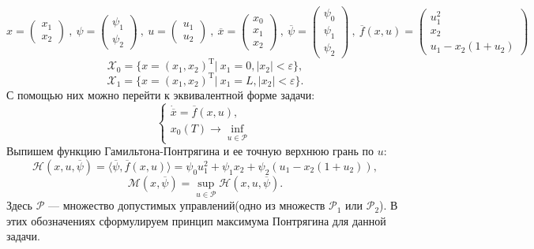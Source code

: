 \documentclass[10pt]{article}
\begin{document}
\[ x = \begin{pmatrix} x_1 \\ x_2 \end{pmatrix} \ , \ \psi = \begin{pmatrix} \psi_1 \\ \psi_2 \end{pmatrix} \ , \  u = \begin{pmatrix} u_1 \\ u_2 \end{pmatrix} \ , \ \overline{x} = \begin{pmatrix} x_0 \\ x_1 \\ x_2 \end{pmatrix} \ , \ \overline{\psi} = \begin{pmatrix} \psi_0 \\ \psi_1 \\ \psi_2 \end{pmatrix} \ , \ \overline{f}(x,u) = \begin{pmatrix} u_1^2 \\ x_2 \\ u_1 - x_2(1 + u_2) \end{pmatrix} \]
\[ \mathcal{X}_0 = \{x = (x_1,x_2)^{\text{T}} | \ x_1 = 0, |x_2| < \varepsilon \}, \]
\[ \mathcal{X}_1 = \{x = (x_1,x_2)^{\text{T}} | \ x_1 = L, |x_2| < \varepsilon \}. \]
С помощью них можно перейти к эквивалентной форме задачи:
\[ \begin{cases} \dot{\overline{x}} = \overline{f}(x, u), \\ x_0(T) \to \inf\limits_{u \in \mathcal{P}} \end{cases} \]
Выпишем функцию Гамильтона-Понтрягина и ее точную верхнюю грань по \( u \):
\[ \mathcal{H}(x, u, \overline{\psi}) = \langle \overline{\psi}, \overline{f}(x,u) \rangle = \psi_0u_1^2 + \psi_1x_2 + \psi_2(u_1  - x_2(1 + u_2)), \]
\[ \mathcal{M}(x, \overline{\psi}) = \sup\limits_{u \in \mathcal{P}} \mathcal{H}(x, u, \overline{\psi}).\]
Здесь \( \mathcal{P}  \) --- множество допустимых управлений(одно из множеств \( \mathcal{P}_1 \) или \( \mathcal{P}_2 \)). В этих обозначениях сформулируем принцип максимума Понтрягина для данной задачи.
\end{document}

